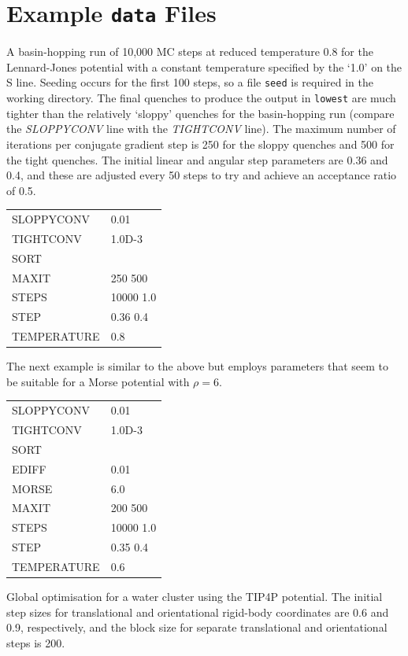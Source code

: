

\section{Example {\tt data} Files}

A basin-hopping run of 10,000 MC steps at reduced temperature $0.8$ for the Lennard-Jones potential
with a constant temperature specified by the `1.0' on the {S\/} line.
Seeding occurs for the first 100 steps, so a file {\tt seed} is required in the 
working directory. The final quenches to produce the output in {\tt lowest} are much
tighter than the relatively `sloppy' quenches for the basin-hopping run (compare the
{\it SLOPPYCONV\/} line with the {\it TIGHTCONV\/} line). The maximum number of iterations per
conjugate gradient step is 250 for the sloppy quenches and 500 for the tight quenches.
The initial linear and angular step parameters are 0.36 and 0.4, and these are adjusted
every 50 steps to try and achieve an acceptance ratio of 0.5.

\medskip
\begin{tabular}{ll}
SLOPPYCONV & 0.01 \\
TIGHTCONV & 1.0D-3 \\
SORT \\
MAXIT & 250 500 \\
STEPS & 10000 1.0 \\
STEP & 0.36 0.4 \\
TEMPERATURE & 0.8 \\
\end{tabular}
\medskip

\noindent The next example is similar to the above but employs parameters that seem
to be suitable for a Morse potential with $\rho=6$.

\medskip
\begin{tabular}{ll}
SLOPPYCONV & 0.01 \\
TIGHTCONV & 1.0D-3 \\
SORT \\
EDIFF & 0.01\\
MORSE & 6.0\\
MAXIT & 200 500\\
STEPS & 10000 1.0\\
STEP & 0.35 0.4\\
TEMPERATURE & 0.6\\
\end{tabular}
\medskip

\noindent Global optimisation for a water cluster using the TIP4P potential.
The initial step sizes for translational and orientational rigid-body coordinates are
0.6 and 0.9, respectively, and the block size for separate translational and orientational
steps is 200.

